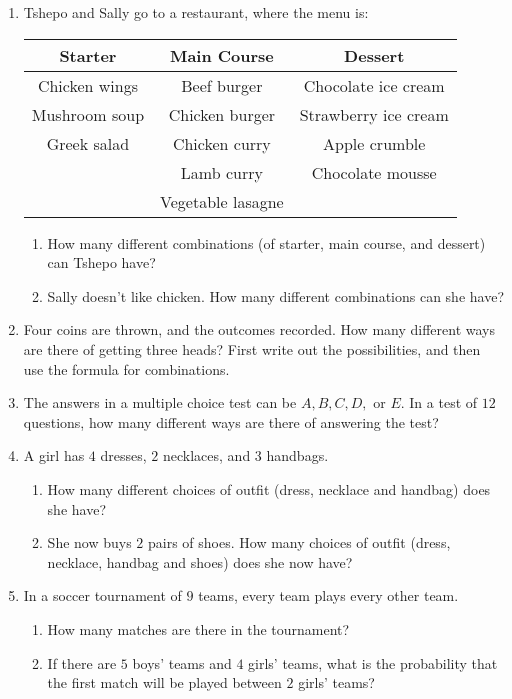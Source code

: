 \begin{eocexercises}{}
\begin{enumerate}
\item Tshepo and Sally go to a restaurant, where the menu is:\\
\begin{tabular}{|c|c|c|}
\hline
Starter & Main Course & Dessert \\
\hline
Chicken wings & Beef burger & Chocolate ice cream \\
Mushroom soup & Chicken burger &  Strawberry ice cream\\
Greek salad & Chicken curry &  Apple crumble\\
 & Lamb curry & Chocolate mousse\\
 & Vegetable lasagne & \\
\hline
\end{tabular}

\begin{enumerate}
\item How many different combinations (of starter, main course, and dessert) can Tshepo have?
\item Sally doesn't like chicken.  How many different combinations can she have?
\end{enumerate}

\item Four coins are thrown, and the outcomes recorded. How many different ways are there of getting three heads? First write out the possibilities, and then use the formula for combinations.

\item The answers in a multiple choice test can be $A, B, C, D,$ or $E$. In a test of $12$ questions, how many different ways are there of answering the test?

\item A girl has $4$ dresses, $2$ necklaces, and $3$ handbags. 
\begin{enumerate} \item How many different choices of outfit (dress, necklace and handbag) does she have?
\item She now buys $2$ pairs of shoes. How many choices of outfit (dress, necklace, handbag and shoes) does she now have?
\end{enumerate}

\item In a soccer tournament of $9$ teams, every team plays every other team. 
\begin{enumerate}
\item How many matches are there in the tournament?
\item If there are $5$ boys' teams and $4$ girls' teams, what is the probability that the first match will be played between $2$ girls' teams?
\end{enumerate}


\end{enumerate}
\end{eocexercises}

